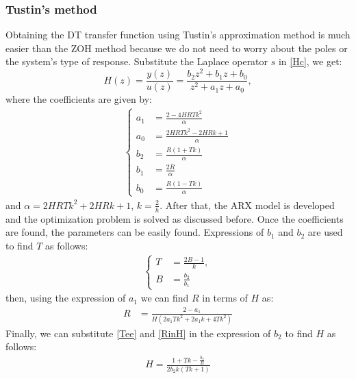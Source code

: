 \documentclass[10pt,journal,final]{IEEEtran}
\begin{document}
\subsubsection{Tustin's method}
Obtaining the DT transfer function using Tustin's approximation method is much easier than the ZOH method {because} we do not need to worry about the poles or the system's type of response. Substitute the {Laplace} operator $s$ in \eqref{Hc}, we get:
\begin{equation}\label{Ztustin's}
H(z)=\frac{y(z)}{u(z)}=\frac{b_{2}z^{2}+b_{1}z+b_{0}}{z^{2}+a_{1}z+a_{0}},
\end{equation}
where the coefficients are given by:
\begin{align}
\begin{cases}
a_{1}&=\frac{2-4HRTk^{2}}{\alpha} \\
a_{0}&=\frac{2HRTk^{2}-2HRk+1}{\alpha}\\
b_{2}&=\frac{R(1+Tk)}{\alpha}\\
b_{1}&=\frac{2R}{\alpha}\\
b_{0}&=\frac{R(1-Tk)}{\alpha}
\end{cases}
\end{align}
and $\alpha=2HRTk^2+2HRk+1$, {$k=\frac{2}{h}$}.
After that, the ARX model is developed and the optimization problem is solved as discussed before. Once the coefficients are found, the parameters can be easily found. Expressions of $b_1$ and $b_2$ are used to find $T$  as follows:
\begin{align}\label{Tee}
\begin{cases}
T&=\frac{2B-1}{k},\\
B&=\frac{b_{2}}{b_{1}}
\end{cases}
\end{align}
then, using the expression of $a_1$ we can find $R$ in terms of $H$ as:
\begin{align}\label{RinH}
R&=\frac{2-a_{1}}{H\left(2a_{1}Tk^{2}+2a_{1}k+4Tk^{2}\right)}
\end{align}
Finally, we can {substitute} \eqref{Tee} and \eqref{RinH} in the expression of $b_2$ to find $H$ as follows:
\begin{align}
H=\frac{1+Tk-\frac{b_{2}}{R}}{2b_{2}k(Tk+1)}
\end{align}
\end{document}

